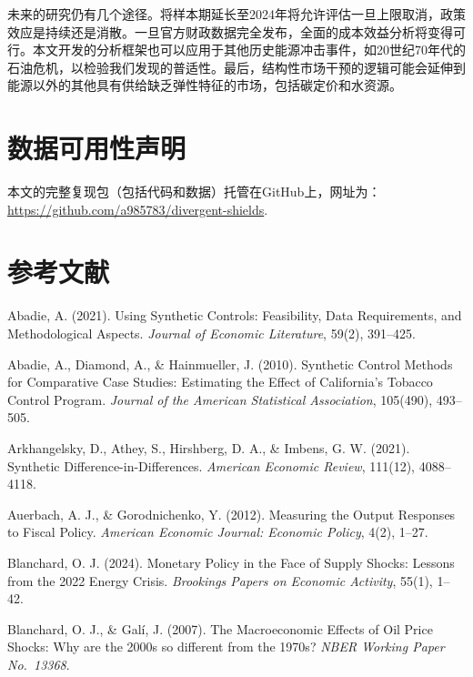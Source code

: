 \documentclass[12pt, a4paper]{article}
\begin{document}
未来的研究仍有几个途径。将样本期延长至2024年将允许评估一旦上限取消，政策效应是持续还是消散。一旦官方财政数据完全发布，全面的成本效益分析将变得可行。本文开发的分析框架也可以应用于其他历史能源冲击事件，如20世纪70年代的石油危机，以检验我们发现的普适性。最后，结构性市场干预的逻辑可能会延伸到能源以外的其他具有供给缺乏弹性特征的市场，包括碳定价和水资源。


\section*{数据可用性声明}

本文的完整复现包（包括代码和数据）托管在GitHub上，网址为：\url{https://github.com/a985783/divergent-shields}.



\section*{参考文献}

\hangindent=0.5cm Abadie, A. (2021). Using Synthetic Controls: Feasibility, Data Requirements, and Methodological Aspects. \textit{Journal of Economic Literature}, 59(2), 391--425.

\hangindent=0.5cm Abadie, A., Diamond, A., \& Hainmueller, J. (2010). Synthetic Control Methods for Comparative Case Studies: Estimating the Effect of California's Tobacco Control Program. \textit{Journal of the American Statistical Association}, 105(490), 493--505.

\hangindent=0.5cm Arkhangelsky, D., Athey, S., Hirshberg, D. A., \& Imbens, G. W. (2021). Synthetic Difference-in-Differences. \textit{American Economic Review}, 111(12), 4088--4118.

\hangindent=0.5cm Auerbach, A. J., \& Gorodnichenko, Y. (2012). Measuring the Output Responses to Fiscal Policy. \textit{American Economic Journal: Economic Policy}, 4(2), 1--27.

\hangindent=0.5cm Blanchard, O. J. (2024). Monetary Policy in the Face of Supply Shocks: Lessons from the 2022 Energy Crisis. \textit{Brookings Papers on Economic Activity}, 55(1), 1--42.

\hangindent=0.5cm Blanchard, O. J., \& Gal\'{i}, J. (2007). The Macroeconomic Effects of Oil Price Shocks: Why are the 2000s so different from the 1970s? \textit{NBER Working Paper No.\ 13368}.
\end{document}
